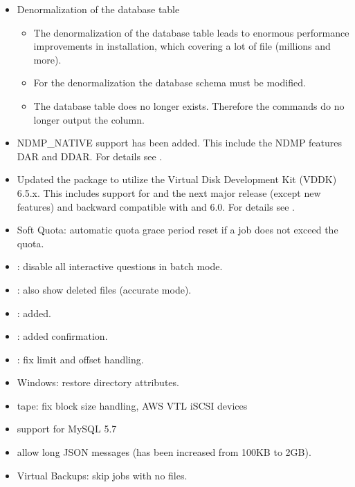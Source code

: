 {\begin{itemize}
  \item Denormalization of the  database table
  \begin{itemize}
    \item The denormalization of the  database table leads to enormous performance improvements in installation, which covering a  lot of file (millions and more).
    \item For the denormalization the database schema must be modified.
    \item The  database table does no longer exists. Therefore the  commands do no longer output the  column.
  \end{itemize}

  \item NDMP\_NATIVE support has been added. This include the NDMP features DAR and DDAR. For details see .
  \item Updated the package  to utilize the Virtual Disk Development Kit (VDDK) 6.5.x. This includes support for  and the next major release (except new features) and backward compatible with  and 6.0. For details see .
  \item Soft Quota: automatic quota grace period reset if a job does not exceed the quota.
  \item {}: disable all interactive questions in batch mode.
  \item {}: also show deleted files (accurate mode).
  \item {}: added.
  \item {}: added confirmation.
  \item {}: fix limit and offset handling.
  \item {} Windows: restore directory attributes.
  \item {} tape: fix block size handling, AWS VTL iSCSI devices
  \item {} support for MySQL 5.7
  \item {} allow long JSON messages (has been increased from 100KB to 2GB).
  \item {} Virtual Backups: skip jobs with no files.
\end{itemize}

}


